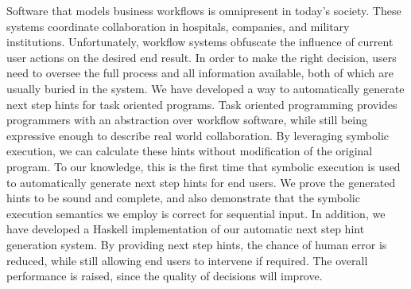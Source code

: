 
Software that models business workflows is omnipresent in today's society.
These systems coordinate collaboration in hospitals, companies, and military institutions.
Unfortunately, workflow systems obfuscate the influence of current user actions on the desired end result.
In order to make the right decision, users need to oversee the full process and all information available,
both of which are usually buried in the system.
We have developed a way to automatically generate next step hints for task oriented programs.
Task oriented programming provides programmers with an abstraction over workflow software, while still being expressive enough to describe real world collaboration.
By leveraging symbolic execution, we can calculate these hints without modification of the original program.
To our knowledge, this is the first time that symbolic execution is used to automatically generate next step hints for end users.
We prove the generated hints to be sound and complete,
and also demonstrate that the symbolic execution semantics we employ is correct for sequential input.
In addition, we have developed a Haskell implementation of our automatic next step hint generation system.
By providing next step hints, the chance of human error is reduced, while still allowing end users to intervene if required.
The overall performance is raised, since the quality of decisions will improve.


